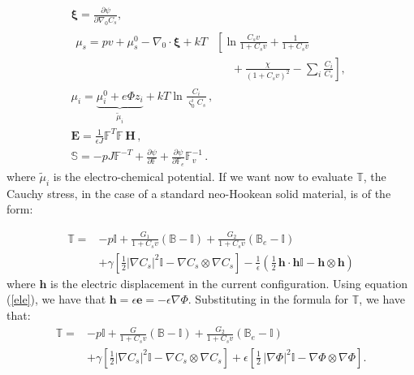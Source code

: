 \documentclass[12pt]{extarticle}
\newcommand{\F}{\ensuremath{\mathbb{F}}}
\begin{document}
\begin{eqnarray}
\boldsymbol{\xi} = \frac{\partial \psi}{\partial \nabla_0 C_s},\\
\begin{aligned}
\mu_s = p v + \mu_s^0 -\nabla_0 \cdot \boldsymbol{\xi} + kT&\left[\ln \frac{C_s v}{1+C_s v} + \frac{1}{1+C_sv}\right.
\\&\left.\ \ \ \ \ \ +\frac{\chi}{(1+C_s v)^2}-\sum_i \frac{C_i}{C_s}\right], 
\end{aligned}\\
\mu_i = \underbrace{\mu^0_i + e\Phi z_i}_{\tilde{\mu}_i} +kT \ln \frac{C_i}{\varsigma^i_0 C_s}\, ,\\
\mathbf{E} = \frac{1}{\epsilon J} \F^T \F\, \mathbf{H}\, ,\label{ele}\\
\mathbb{S} = -p J \F^{-T} + \frac{\partial \psi}{\partial \F}+ \frac{\partial \psi}{\partial\F_e}\F_v^{-1}\,.
\end{eqnarray}
where $\tilde{\mu}_i$ is the electro-chemical potential.
If we want now to evaluate $\mathbb{T}$, the Cauchy stress, in the case of a standard neo-Hookean solid material, is of the form:

\begin{equation*}
\begin{aligned}
\mathbb{T}= &-p \mathbb{I} + \frac{G_1}{1+C_sv}\left(\mathbb{B}-\mathbb{I}\right) + \frac{G_2}{1+C_sv}\left(\mathbb{B}_e-\mathbb{I}\right)\\ &+\gamma \left[\frac{1}{2} |\nabla C_s|^2\mathbb{I} - \nabla C_s \otimes \nabla C_s\right]- \frac{1}{\epsilon} \left(\frac{1}{2} \,\mathbf{h}\cdot  \mathbf{h} \mathbb{I} -\mathbf{h} \otimes \mathbf{h}\right)
\end{aligned}
\end{equation*} 
where $\mathbf{h}$ is the electric displacement in the current configuration. Using equation (\ref{ele}), we have that $\mathbf{h}=\epsilon \mathbf{e}=-\epsilon \nabla \Phi$. Substituting in the formula for $\mathbb{T}$, we have that:
\begin{equation*}
\begin{aligned}
\mathbb{T}= &-p \mathbb{I} + \frac{G}{1+C_sv}\left(\mathbb{B}-\mathbb{I}\right) + \frac{G_2}{1+C_sv}\left(\mathbb{B}_e-\mathbb{I}\right)\\
&+ \gamma \left[\frac{1}{2} |\nabla C_s|^2\mathbb{I} - \nabla C_s \otimes \nabla C_s\right]+ \epsilon \left[\frac{1}{2} \,|\nabla \Phi|^2\mathbb{I} -\nabla \Phi \otimes \nabla \Phi\right].
\end{aligned}
\end{equation*} 
\end{document}
